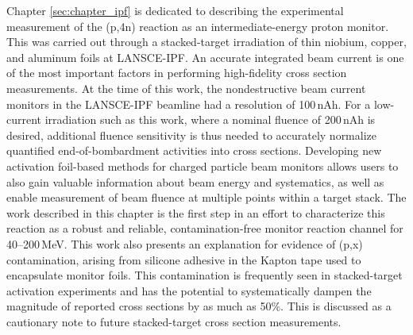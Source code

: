 

Chapter \ref{sec:chapter_ipf} is dedicated to describing the experimental measurement of the (p,4n) reaction as an intermediate-energy proton monitor.
This was carried out through a stacked-target irradiation of thin niobium, copper, and aluminum foils at LANSCE-IPF.
An accurate integrated beam current is one of the most important factors in performing high-fidelity cross section measurements.
At the time of this work, the nondestructive beam current monitors in the LANSCE-IPF beamline had a  resolution of 100\,nAh.
For a low-current irradiation such as this work, where a nominal fluence of 200\,nAh is desired, additional fluence sensitivity is thus needed to accurately normalize quantified end-of-bombardment activities into cross sections.
Developing  new activation foil-based methods for charged particle beam monitors allows users to also gain valuable information about beam energy and systematics, as well as enable measurement of beam fluence at multiple points within a target stack.
The work described in this chapter is the first step in an effort to characterize this reaction as a robust and reliable, contamination-free monitor reaction channel for 40--200\,MeV.
This work also presents an explanation for evidence of (p,x) contamination, arising from silicone adhesive in the Kapton tape used to encapsulate monitor foils. 
This contamination is frequently seen in stacked-target activation experiments and has the potential to systematically dampen the magnitude of reported cross sections by as much as 50\%. 
This is discussed as a cautionary note to future stacked-target cross section measurements.




